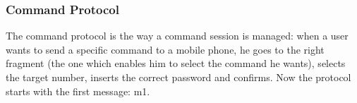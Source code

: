 \subsubsection{Command Protocol}
The command protocol is the way a command session is managed: when a user wants to send a specific command to a mobile phone, he goes to the right fragment (the one which enables him to select the command he wants), selects the target number, inserts the correct password and confirms. Now the protocol starts with the first message: m1.